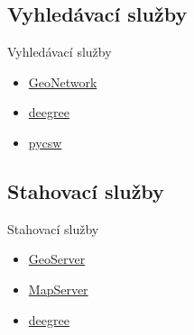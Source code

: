 \documentclass{beamer}
\begin{document}
\subsection{Vyhledávací služby}
\begin{frame}{Vyhledávací služby}
    \begin{itemize}
        \item \href{http://geonetwork-opensource.org}{GeoNetwork}
        \item \href{http://deegree.org}{deegree}
        \item \href{http://pycsw.org}{pycsw}
    \end{itemize}
\end{frame}

\subsection{Stahovací služby}
\begin{frame}{Stahovací služby}
    \begin{itemize}
        \item \href{http://geoserver.org}{GeoServer}
        \item \href{http://mapserver.org}{MapServer}
        \item \href{http://deegree.org}{deegree}
    \end{itemize}
\end{frame}
\end{document}
